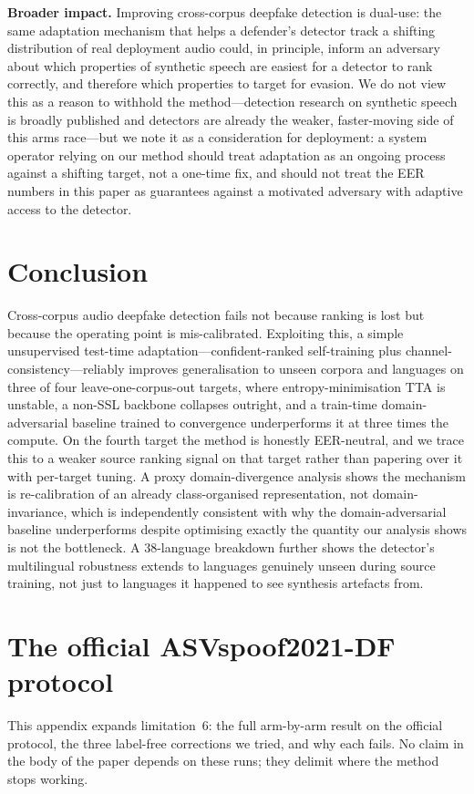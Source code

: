 \documentclass[conference]{IEEEtran}
\begin{document}
\textbf{Broader impact.} Improving cross-corpus deepfake detection is
dual-use: the same adaptation mechanism that helps a defender's detector track
a shifting distribution of real deployment audio could, in principle, inform
an adversary about which properties of synthetic speech are easiest for a
detector to rank correctly, and therefore which properties to target for
evasion. We do not view this as a reason to withhold the method---detection
research on synthetic speech is broadly published and detectors are already
the weaker, faster-moving side of this arms race---but we note it as a
consideration for deployment: a system operator relying on our method should
treat adaptation as an ongoing process against a shifting target, not a
one-time fix, and should not treat the EER numbers in this paper as
guarantees against a motivated adversary with adaptive access to the detector.

\section{Conclusion}
Cross-corpus audio deepfake detection fails not because ranking is lost but
because the operating point is mis-calibrated. Exploiting this, a simple
unsupervised test-time adaptation---confident-ranked self-training plus
channel-consistency---reliably improves generalisation to unseen corpora and
languages on three of four leave-one-corpus-out targets, where
entropy-minimisation TTA is unstable, a non-SSL backbone collapses outright,
and a train-time domain-adversarial baseline trained to convergence
underperforms it at three times the compute. On the fourth target the method
is honestly EER-neutral, and we trace this to a weaker source ranking signal
on that target rather than papering over it with per-target tuning. A proxy
domain-divergence analysis shows the mechanism is re-calibration of an
already class-organised representation, not domain-invariance, which is
independently consistent with why the domain-adversarial baseline
underperforms despite optimising exactly the quantity our analysis shows is
not the bottleneck. A 38-language breakdown further shows the detector's
multilingual robustness extends to languages genuinely unseen during source
training, not just to languages it happened to see synthesis artefacts from.

\appendices

\section{The official ASVspoof2021-DF protocol}
\label{app:protocola}
This appendix expands limitation~6: the full arm-by-arm result on the official
protocol, the three label-free corrections we tried, and why each fails. No
claim in the body of the paper depends on these runs; they delimit where the
method stops working.
\end{document}
